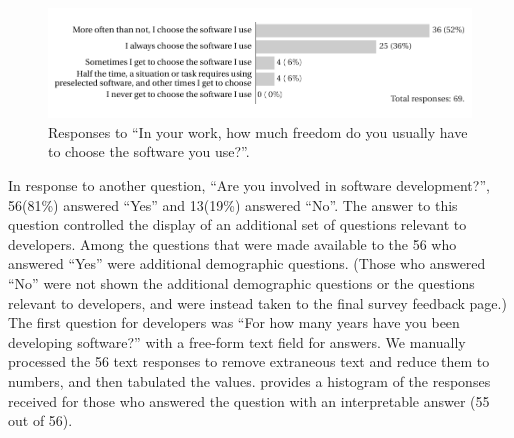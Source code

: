\documentclass{casicswhitepaper}
\newcommand{\totalDevelopers}{56\xspace}
\newcommand{\totalNotDevelopers}{13\xspace}
\begin{document}
\begin{figure}[htb]
  \vspace*{1ex}
  \centering
  \includegraphics{files/plots/how-often-choose-software.pdf}
  \vspace*{-4ex}
  \caption{Responses to ``In your work, how much freedom do you usually have to choose the software you use?''.}
  \label{freedom}
\end{figure}

In response to another question, ``Are you involved in software development?'', \totalDevelopers (81\%) answered ``Yes'' and \totalNotDevelopers (19\%) answered ``No''.  The answer to this question controlled the display of an additional set of questions relevant to developers.  Among the questions that were made available to the \totalDevelopers who answered ``Yes'' were additional demographic questions.  (Those who answered ``No'' were not shown the additional demographic questions or the questions relevant to developers, and were instead taken to the final survey feedback page.)  The first question for developers was ``For how many years have you been developing software?'' with a free-form text field for answers.  We manually processed the \totalDevelopers text responses to remove extraneous text and reduce them to numbers, and then tabulated the values.   provides a histogram of the responses received for those who answered the question with an interpretable answer (55 out of \totalDevelopers).

\end{document}
